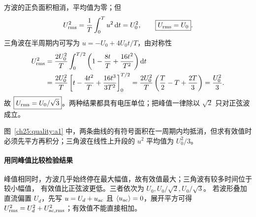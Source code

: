 \begin{xesolution}
\begin{center}\begin{minipage}{.96\linewidth}\centering
{}
\end{minipage}\end{center}

方波的正负面积相消，平均值为零；但
\[
 U_{\rm rms}^2=\frac1T\int_0^T u^2\mathop{}\!\mathrm d t=U_0^2,
 \qquad \boxed{U_{\rm rms}=U_0}.
\]
三角波在半周期内可写为 $u=-U_0+4U_0t/T$，由对称性
\begin{align*}
 U_{\rm rms}^2
 &=\frac{2U_0^2}{T}\int_0^{T/2}\left(1-\frac{8t}{T}+\frac{16t^2}{T^2}\right)\mathop{}\!\mathrm d t\\
 &=\frac{2U_0^2}{T}\left[t-\frac{4t^2}{T}+\frac{16t^3}{3T^2}\right]_0^{T/2}
 =\frac{2U_0^2}{T}\left(\frac T2-T+\frac{2T}{3}\right)=\frac{U_0^2}{3}.
\end{align*}
故 $\boxed{U_{\rm rms}=U_0/\sqrt3}$。两种结果都具有电压单位；把峰值一律除以 $\sqrt2$ 只对正弦波成立。

图~\ref{ch25:quality:a1} 中，两条曲线的有符号面积在一周期内均抵消，但求有效值时必须先平方再积分；三角波在线性上升段的 $u^2$ 平均值为 $U_0^2/3$。
\end{xesolution}



\paragraph{用同峰值比较检验结果}
峰值相同时，方波几乎始终停在最大幅值，故有效值最大；三角波有较多时间位于较小幅值，
有效值比正弦波更低。三者依次为 $U_0,U_0/\sqrt2,U_0/\sqrt3$。
若波形叠加直流偏置 $U_d$，先写 $u=U_d+u_{\rm ac}$ 且 $\langle u_{\rm ac}\rangle=0$，展开平方可得
$U_{\rm rms}^2=U_d^2+U_{{\rm ac,rms}}^2$；有效值不能直接相加。


